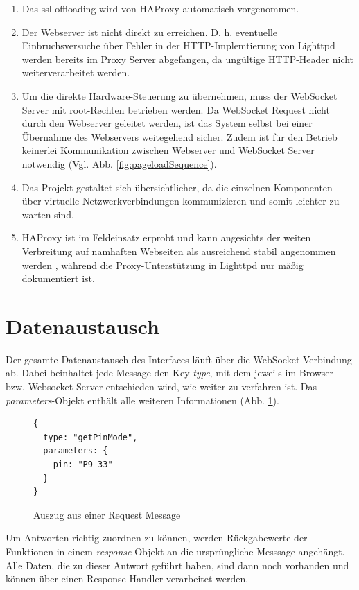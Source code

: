 \begin{enumerate}
\item Das \gls{ssl-offloading} wird von HAProxy automatisch vorgenommen.
\item Der Webserver ist nicht direkt zu erreichen. D. h. eventuelle Einbruchsversuche über Fehler in der HTTP-Implemtierung von Lighttpd werden bereits im Proxy Server abgefangen, da ungültige HTTP-Header nicht weiterverarbeitet werden.
\item Um die direkte Hardware-Steuerung zu übernehmen, muss der WebSocket Server mit root-Rechten betrieben werden. Da WebSocket Request nicht durch den Webserver geleitet werden, ist das System selbst bei einer Übernahme des Webservers weitegehend sicher. Zudem ist für den Betrieb keinerlei Kommunikation zwischen Webserver und WebSocket Server notwendig (Vgl. Abb. \ref{fig:pageloadSequence}).
\item Das Projekt gestaltet sich übersichtlicher, da die einzelnen Komponenten über virtuelle Netzwerkverbindungen kommunizieren und somit leichter zu warten sind.   
\item HAProxy ist im Feldeinsatz erprobt und kann angesichts der weiten Verbreitung auf namhaften Webseiten als ausreichend stabil angenommen werden \cite{kuehnast2014}, während die Proxy-Unterstützung in Lighttpd nur mäßig dokumentiert ist.
\end{enumerate}


\section{Datenaustausch}
Der gesamte Datenaustausch des Interfaces läuft über die WebSocket-Verbindung ab. Dabei beinhaltet jede Message den Key \textit{type}, mit dem jeweils im Browser bzw. Websocket Server entschieden wird, wie weiter zu verfahren ist. Das \textit{parameters}-Objekt enthält alle weiteren Informationen (Abb. \ref{lst:requestMessage}).\\

\begin{figure}[ht]
\begin{lstlisting}
{
  type: "getPinMode",
  parameters: {
    pin: "P9_33"
  }
}
\end{lstlisting}
\caption{Auszug aus einer Request Message}
\label{lst:requestMessage}
\end{figure}

Um Antworten richtig zuordnen zu können, werden Rückgabewerte der Funktionen in einem \textit{response}-Objekt an die ursprüngliche Messsage angehängt. Alle Daten, die zu dieser Antwort geführt haben, sind dann noch vorhanden und können über einen Response Handler verarbeitet werden.\\

